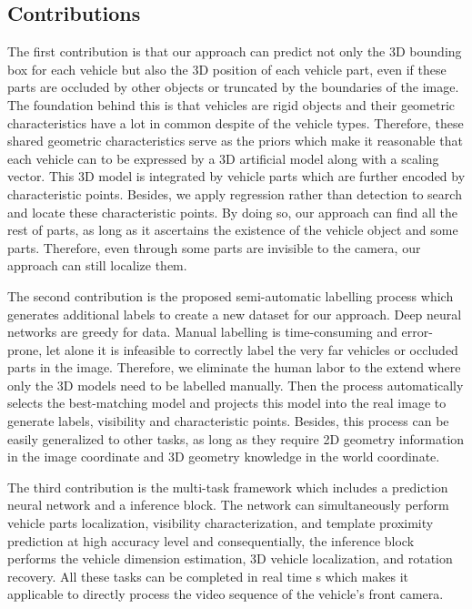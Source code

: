 \subsection{Contributions}

The first contribution is that our approach can predict not only the 3D bounding box for each vehicle but also the 3D position of each vehicle part, even if these parts are occluded by other objects or truncated by the boundaries of the image. The foundation behind this is that vehicles are rigid objects and their geometric characteristics have a lot in common despite of the vehicle types. Therefore, these shared geometric characteristics serve as the priors which make it reasonable that each vehicle can to be expressed by a 3D artificial model along with a scaling vector. This 3D model is integrated by vehicle parts which are further encoded by characteristic points. Besides, we apply regression rather than detection to search and locate these characteristic points. By doing so, our approach can find all the rest of parts, as long as it ascertains the existence of the vehicle object and some parts. Therefore, even through some parts are invisible to the camera, our approach can still localize them. 

The second contribution is the proposed semi-automatic labelling process which generates additional labels to create a new dataset for our approach.  Deep neural networks are greedy for data. Manual labelling is time-consuming and error-prone, let alone it is infeasible to correctly label the very far vehicles or occluded parts in the image. Therefore, we eliminate the human labor to the extend where only the 3D models need to be labelled manually. Then the process automatically selects the best-matching model and projects this model into the real image to generate labels, \eg visibility and characteristic points.  Besides, this process can be easily generalized to other tasks, as long as they require 2D geometry information in the image coordinate and 3D geometry knowledge in the world coordinate.

The third contribution is the multi-task framework which includes a prediction neural network and a inference block. The network can simultaneously perform vehicle parts localization, visibility characterization, and template proximity prediction at high accuracy level and consequentially, the inference block performs the vehicle dimension estimation,  3D vehicle localization, and rotation recovery. All these tasks can be completed in real time \tbd s which makes it applicable to directly process the video sequence of the vehicle's front camera.